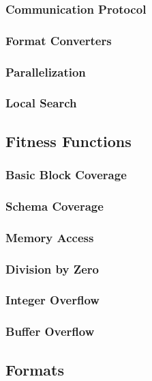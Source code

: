 \documentclass[a4paper]{scrartcl}
\begin{document}
\subsubsection{Communication Protocol}
\subsubsection{Format Converters}
\subsubsection{Parallelization}
\subsubsection{Local Search}
\subsection{Fitness Functions}
\subsubsection{Basic Block Coverage}
\subsubsection{Schema Coverage}
\subsubsection{Memory Access}
\subsubsection{Division by Zero}
\subsubsection{Integer Overflow}
\subsubsection{Buffer Overflow}
\subsection{Formats}
\end{document}
